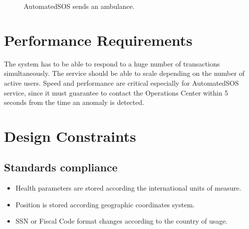\begin{figure}[H]
    \renewcommand{\thefigure}{\alph{figure}}
    \caption{AutomatedSOS sends an ambulance.}
\end{figure}

\clearpage

\section{Performance Requirements}
The system has to be able to respond to a huge number of transactions simultaneously. The service should be able to scale depending on the number of active users. 
Speed and performance are critical especially for AutomatedSOS service, since it must guarantee to contact the Operations Center within 5 seconds from the time an anomaly is detected.

\section{Design Constraints}
\subsection{Standards compliance}
    \begin{itemize}
        \item Health parameters are stored according the international units of measure.
        \item Position is stored according geographic coordinates system.
        \item SSN or Fiscal Code format changes according to the country of usage.
    \end{itemize}

